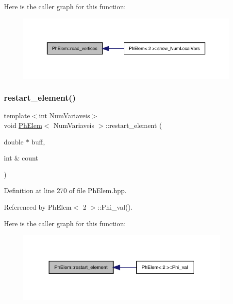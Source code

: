 Here is the caller graph for this function\+:
\nopagebreak
\begin{figure}[H]
\begin{center}
\leavevmode
\includegraphics[width=343pt]{classPhElem_a8abc7be8120f4192de31e0cfb32ac968_icgraph}
\end{center}
\end{figure}
\mbox{\label{classPhElem_abe273d496e748985021a8f67ef598c0d}} 
\subsubsection{\texorpdfstring{restart\+\_\+element()}{restart\_element()}}
{\footnotesize\ttfamily template$<$int Num\+Variaveis$>$ \\
void \hyperlink{classPhElem}{Ph\+Elem}$<$ Num\+Variaveis $>$\+::restart\+\_\+element (\begin{DoxyParamCaption}\item[{double $\ast$}]{buff,  }\item[{int \&}]{count }\end{DoxyParamCaption})}



Definition at line 270 of file Ph\+Elem.\+hpp.



Referenced by Ph\+Elem$<$ 2 $>$\+::\+Phi\+\_\+val().

Here is the caller graph for this function\+:
\nopagebreak
\begin{figure}[H]
\begin{center}
\leavevmode
\includegraphics[width=304pt]{classPhElem_abe273d496e748985021a8f67ef598c0d_icgraph}
\end{center}
\end{figure}
\mbox{\label{classPhElem_a7094a0e8767868c583cc948e56214a9d}} 
